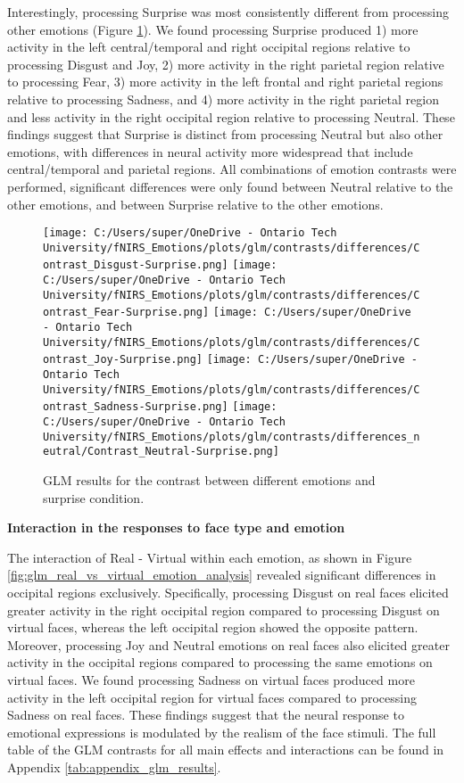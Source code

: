 Interestingly, processing Surprise was most consistently different from processing other emotions (Figure \ref{fig:glm_emotion_analysis_surprise}). 
We found processing Surprise produced 1) more activity in the left central/temporal and right occipital regions relative to processing Disgust and Joy, 
2) more activity in the right parietal region relative to processing Fear, 3) more activity in the left frontal and right parietal regions relative to processing Sadness, and
4) more activity in the right parietal region and less activity in the right occipital region relative to processing Neutral.
These findings suggest that Surprise is distinct from processing Neutral but also other emotions, with differences in neural activity more widespread that include central/temporal and parietal regions. 
All combinations of emotion contrasts were performed, significant differences were only found between Neutral relative to the other emotions, and between Surprise relative to the other emotions.

\begin{figure}[H]
    \centering
      \texttt{[image: C:/Users/super/OneDrive - Ontario Tech University/fNIRS\_Emotions/plots/glm/contrasts/differences/Contrast\_Disgust-Surprise.png]}
      \texttt{[image: C:/Users/super/OneDrive - Ontario Tech University/fNIRS\_Emotions/plots/glm/contrasts/differences/Contrast\_Fear-Surprise.png]}
      \texttt{[image: C:/Users/super/OneDrive - Ontario Tech University/fNIRS\_Emotions/plots/glm/contrasts/differences/Contrast\_Joy-Surprise.png]}
      \texttt{[image: C:/Users/super/OneDrive - Ontario Tech University/fNIRS\_Emotions/plots/glm/contrasts/differences/Contrast\_Sadness-Surprise.png]}
      \texttt{[image: C:/Users/super/OneDrive - Ontario Tech University/fNIRS\_Emotions/plots/glm/contrasts/differences\_neutral/Contrast\_Neutral-Surprise.png]}
      \caption[GLM: Emotion vs. Surprise]{GLM results for the contrast between different emotions and surprise condition.}
      \label{fig:glm_emotion_analysis_surprise}
\end{figure}

\noindent
\textbf{Interaction in the responses to face type and emotion}

The interaction of Real - Virtual within each emotion, as shown in Figure \ref{fig:glm_real_vs_virtual_emotion_analysis} revealed significant differences in occipital regions exclusively.
Specifically, processing Disgust on real faces elicited greater activity in the right occipital region compared to processing Disgust on virtual faces, whereas the left occipital region showed the opposite pattern.
Moreover, processing Joy and Neutral emotions on real faces also elicited greater activity in the occipital regions compared to processing the same emotions on virtual faces.
We found processing Sadness on virtual faces produced more activity in the left occipital region for virtual faces compared to processing Sadness on real faces. 
These findings suggest that the neural response to emotional expressions is modulated by the realism of the face stimuli. 
The full table of the GLM contrasts for all main effects and interactions can be found in Appendix \ref{tab:appendix_glm_results}.

